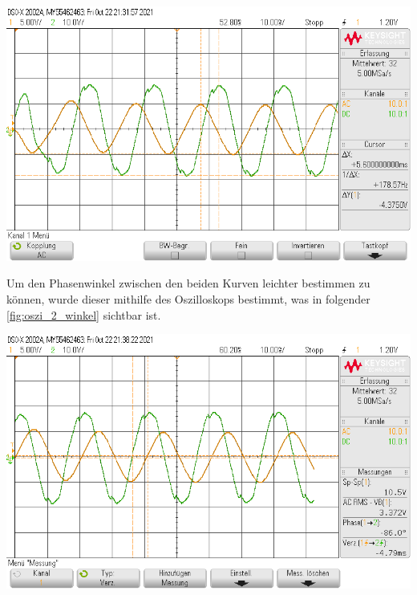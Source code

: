 \documentclass[11pt,ngerman]{scrartcl}
\begin{document}
\begin{center}
	\begin{minipage}[t]{0.7\textwidth}
		\includegraphics[width=\textwidth]{Phasenzeug/scope_5}
		\label{fig:oszi_2}
	\end{minipage}
\end{center}

Um den Phasenwinkel zwischen den beiden Kurven leichter bestimmen zu können, wurde dieser mithilfe des Oszilloskops bestimmt, was in folgender \autoref{fig:oszi_2_winkel} sichtbar ist.

\begin{center}
	\begin{minipage}[t]{0.7\textwidth}
		\includegraphics[width=\textwidth]{Phasenzeug/scope_6}
		\label{fig:oszi_2_winkel}
	\end{minipage}
\end{center}
\end{document}
